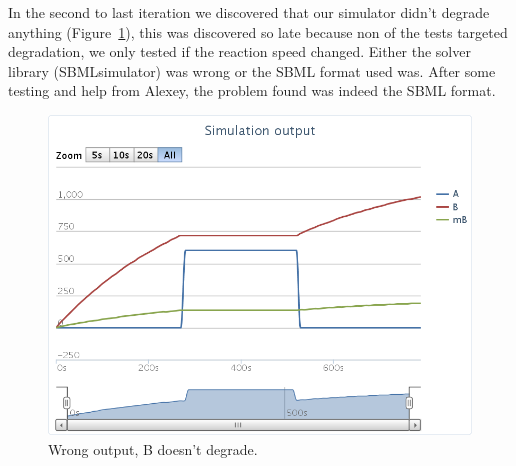 In the second to last iteration we discovered that our simulator didn't degrade anything (Figure~\ref{fig:wrong}), this was discovered so late because non of the tests targeted degradation, we only tested if the reaction speed changed. Either the solver library (SBMLsimulator) was wrong or the SBML format used was. After some testing and help from Alexey, the problem found was indeed the SBML format.\\

\begin{figure}[h!]
	\centering\includegraphics[scale=0.35]{../../screenshots/2012-05-31-not-output.png}
	\caption{Wrong output, B doesn't degrade.}
	\label{fig:wrong}
\end{figure}

